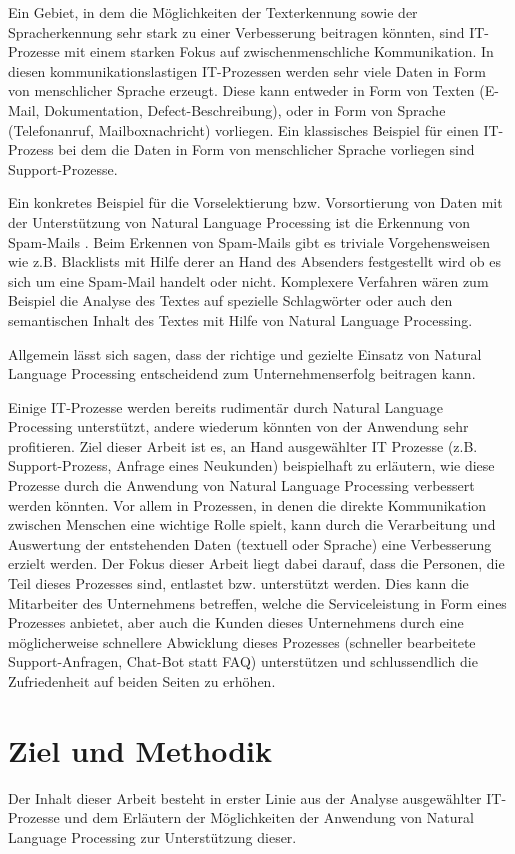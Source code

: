 Ein Gebiet, in dem die Möglichkeiten der Texterkennung sowie der Spracherkennung sehr stark zu einer Verbesserung beitragen könnten, sind IT-Prozesse mit einem starken Fokus auf zwischenmenschliche Kommunikation. In diesen kommunikationslastigen IT-Prozessen werden sehr viele Daten in Form von menschlicher Sprache erzeugt. Diese kann entweder in Form von Texten (E-Mail, Dokumentation, Defect-Beschreibung), oder in Form von Sprache (Telefonanruf, Mailboxnachricht) vorliegen. Ein klassisches Beispiel für einen IT-Prozess bei dem die Daten in Form von menschlicher Sprache vorliegen sind Support-Prozesse. 

Ein konkretes Beispiel für die Vorselektierung bzw. Vorsortierung von Daten mit der Unterstützung von Natural Language Processing ist die Erkennung von Spam-Mails \cite{Dinsoreanu2014}. Beim Erkennen von Spam-Mails gibt es triviale Vorgehensweisen wie z.B. Blacklists mit Hilfe derer an Hand des Absenders festgestellt wird ob es sich um eine Spam-Mail handelt oder nicht. Komplexere Verfahren wären zum Beispiel die Analyse des Textes auf spezielle Schlagwörter oder auch den semantischen Inhalt des Textes mit Hilfe von Natural Language Processing.

Allgemein lässt sich sagen, dass der richtige und gezielte Einsatz von Natural Language Processing entscheidend zum Unternehmenserfolg beitragen kann. 

Einige IT-Prozesse werden bereits rudimentär durch Natural Language Processing unterstützt, andere wiederum könnten von der Anwendung sehr profitieren. Ziel dieser Arbeit ist es, an Hand ausgewählter IT Prozesse (z.B. Support-Prozess, Anfrage eines Neukunden) beispielhaft zu erläutern, wie diese Prozesse durch die Anwendung von Natural Language Processing verbessert werden könnten. Vor allem in Prozessen, in denen die direkte Kommunikation zwischen Menschen eine wichtige Rolle spielt, kann durch die Verarbeitung und Auswertung der entstehenden Daten (textuell oder Sprache) eine Verbesserung erzielt werden. Der Fokus dieser Arbeit liegt dabei darauf, dass die Personen, die Teil dieses Prozesses sind, entlastet bzw. unterstützt werden. Dies kann die Mitarbeiter des Unternehmens betreffen, welche die Serviceleistung in Form eines Prozesses anbietet, aber auch die Kunden dieses Unternehmens durch eine möglicherweise schnellere Abwicklung dieses Prozesses (schneller bearbeitete Support-Anfragen, Chat-Bot statt FAQ) unterstützen und schlussendlich die Zufriedenheit auf beiden Seiten zu erhöhen. 

\section{Ziel und Methodik}
Der Inhalt dieser Arbeit besteht in erster Linie aus der Analyse ausgewählter IT-Prozesse und dem Erläutern der Möglichkeiten der Anwendung von Natural Language Processing zur Unterstützung dieser. 

